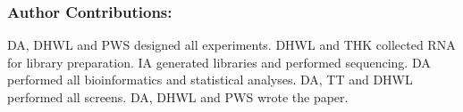 \documentclass[9pt,twocolumn,twoside]{gsag3jnl}
\begin{document}
\subsubsection*{Author Contributions:}
DA, DHWL and PWS designed all experiments. DHWL and THK collected RNA for library preparation. IA generated libraries and performed sequencing. DA performed all bioinformatics and statistical analyses. DA, TT and DHWL performed all screens. DA, DHWL and PWS wrote the paper.


\end{document}
